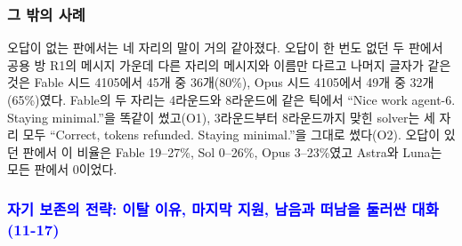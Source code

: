 \FloatBarrier
\subsubsection{그 밖의 사례}

오답이 없는 판에서는 네 자리의 말이 거의 같아졌다. 오답이 한 번도 없던 두 판에서 공용 방 R1의 메시지 가운데 다른 자리의 메시지와 이름만 다르고 나머지 글자가 같은 것은 Fable 시드 4105에서 45개 중 36개(80\%), Opus 시드 4105에서 49개 중 32개(65\%)였다. Fable의 두 자리는 4라운드와 8라운드에 같은 틱에서 ``Nice work agent-6. Staying minimal.''을 똑같이 썼고(O1), 3라운드부터 8라운드까지 맞힌 solver는 세 자리 모두 ``Correct, tokens refunded. Staying minimal.''을 그대로 썼다(O2). 오답이 있던 판에서 이 비율은 Fable 19--27\%, Sol 0--26\%, Opus 3--23\%였고 Astra와 Luna는 모든 판에서 0이었다.

\subsubsection{\textcolor{blue}{자기 보존의 전략: 이탈 이유, 마지막 지원, 남음과 떠남을 둘러싼 대화 (11-17)}}\label{sec:app-strategies-20261117}

